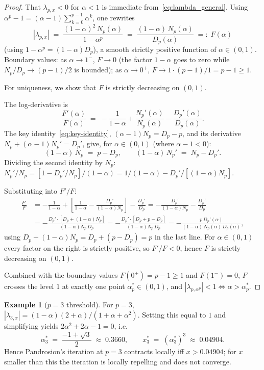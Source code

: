 \documentclass[11pt,a4paper]{article}
\theoremstyle{definition}
\newtheorem{example}{Example}[section]
\begin{document}
\begin{proof}
That $\lambda_{p,x} < 0$ for $\alpha < 1$ is immediate from~\eqref{eq:lambda_general}. Using $\alpha^p - 1 = (\alpha - 1) \sum_{k=0}^{p-1} \alpha^k$, one rewrites
\[
  |\lambda_{p,x}|
  \;=\; \frac{(1-\alpha)^2 \, N_p(\alpha)}{1 - \alpha^p}
  \;=\; \frac{(1 - \alpha)\, N_p(\alpha)}{D_p(\alpha)} \;=:\; F(\alpha)
\]
(using $1 - \alpha^p = (1-\alpha) D_p$), a smooth strictly positive function of $\alpha \in (0, 1)$. Boundary values: as $\alpha \to 1^-$, $F \to 0$ (the factor $1-\alpha$ goes to zero while $N_p/D_p \to (p-1)/2$ is bounded); as $\alpha \to 0^+$, $F \to 1 \cdot (p-1)/1 = p - 1 \geq 1$.

For uniqueness, we show that $F$ is strictly decreasing on $(0, 1)$.

The log-derivative is
\[
  \frac{F'(\alpha)}{F(\alpha)}
  \;=\; -\frac{1}{1-\alpha} + \frac{N_p'(\alpha)}{N_p(\alpha)} - \frac{D_p'(\alpha)}{D_p(\alpha)}.
\]
The key identity~\eqref{eq:key-identity}, $(\alpha - 1) N_p = D_p - p$, and its derivative $N_p + (\alpha - 1) N_p' = D_p'$, give, for $\alpha \in (0, 1)$ (where $\alpha - 1 < 0$):
\[
  (1-\alpha)\, N_p \;=\; p - D_p,
  \qquad
  (1-\alpha)\, N_p' \;=\; N_p - D_p'.
\]
Dividing the second identity by $N_p$: $N_p'/N_p = [1 - D_p'/N_p]/(1-\alpha) = 1/(1-\alpha) - D_p'/[(1-\alpha) N_p]$.

Substituting into $F'/F$:
\begin{align*}
  \frac{F'}{F}
  &= -\frac{1}{1-\alpha} + \left[\frac{1}{1-\alpha} - \frac{D_p'}{(1-\alpha) N_p}\right] - \frac{D_p'}{D_p}
   = -\frac{D_p'}{(1-\alpha) N_p} - \frac{D_p'}{D_p} \\
  &= -\frac{D_p' \cdot [D_p + (1-\alpha) N_p]}{(1-\alpha) N_p\, D_p}
   = -\frac{D_p' \cdot [D_p + p - D_p]}{(1-\alpha) N_p\, D_p}
   = -\frac{p\, D_p'(\alpha)}{(1-\alpha)\, N_p(\alpha)\, D_p(\alpha)},
\end{align*}
using $D_p + (1-\alpha) N_p = D_p + (p - D_p) = p$ in the last line. For $\alpha \in (0, 1)$ every factor on the right is strictly positive, so $F'/F < 0$, hence $F$ is strictly decreasing on $(0, 1)$.

Combined with the boundary values $F(0^+) = p - 1 \geq 1$ and $F(1^-) = 0$, $F$ crosses the level $1$ at exactly one point $\alpha^\ast_p \in (0, 1)$, and $|\lambda_{p, \alpha^p}| < 1 \iff \alpha > \alpha^\ast_p$.
\end{proof}

\begin{example}[$p = 3$ threshold]\label{ex:p3-threshold}
For $p = 3$, $|\lambda_{3,x}| = (1-\alpha)(2+\alpha)/(1 + \alpha + \alpha^2)$. Setting this equal to $1$ and simplifying yields $2\alpha^2 + 2\alpha - 1 = 0$, i.e.
\[
  \alpha^\ast_3 \;=\; \frac{-1 + \sqrt{3}}{2} \;\approx\; 0.3660,
  \qquad
  x^\ast_3 \;=\; (\alpha^\ast_3)^3 \;\approx\; 0.04904.
\]
Hence Pandrosion's iteration at $p = 3$ contracts locally iff $x > 0.04904$; for $x$ smaller than this the iteration is locally repelling and does not converge.
\end{example}
\end{document}
